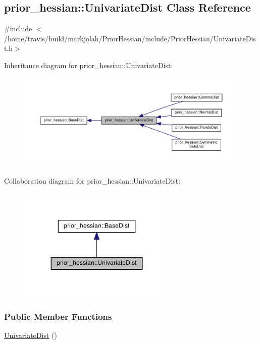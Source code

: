 \hypertarget{classprior__hessian_1_1UnivariateDist}{}\subsection{prior\+\_\+hessian\+:\+:Univariate\+Dist Class Reference}
\label{classprior__hessian_1_1UnivariateDist}


{\ttfamily \#include $<$/home/travis/build/markjolah/\+Prior\+Hessian/include/\+Prior\+Hessian/\+Univariate\+Dist.\+h$>$}



Inheritance diagram for prior\+\_\+hessian\+:\+:Univariate\+Dist\+:\nopagebreak
\begin{figure}[H]
\begin{center}
\leavevmode
\includegraphics[width=350pt]{classprior__hessian_1_1UnivariateDist__inherit__graph}
\end{center}
\end{figure}


Collaboration diagram for prior\+\_\+hessian\+:\+:Univariate\+Dist\+:\nopagebreak
\begin{figure}[H]
\begin{center}
\leavevmode
\includegraphics[width=215pt]{classprior__hessian_1_1UnivariateDist__coll__graph}
\end{center}
\end{figure}
\subsubsection*{Public Member Functions}
\begin{DoxyCompactItemize}
\item 
\hyperlink{classprior__hessian_1_1UnivariateDist_ac94b6fd5932b4698307fb3894f2c7577}{Univariate\+Dist} ()
\end{DoxyCompactItemize}
